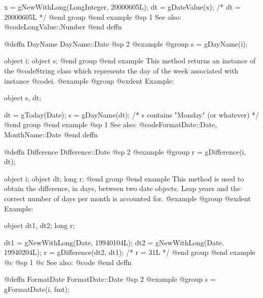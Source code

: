 x = gNewWithLong(LongInteger, 20000605L);
dt = gDateValue(x);    /*  dt = 20000605L  */
@end group
@end example
@sp 1
See also:  @code{LongValue::Number}
@end deffn











@deffn {DayName} DayName::Date
@sp 2
@example
@group
s = gDayName(i);

object  i;
object  s;
@end group
@end example
This method returns an instance of the @code{String} class which represents
the day of the week associated with instance @code{i}.
@example
@group
@exdent Example:

object  s, dt;

dt = gToday(Date);
s = gDayName(dt);   /*  s contains "Monday" (or whatever)  */
@end group
@end example
@sp 1
See also:  @code{FormatDate::Date, MonthName::Date}
@end deffn










@deffn {Difference} Difference::Date
@sp 2
@example
@group
r = gDifference(i, dt);

object  i;
object  dt;
long    r;
@end group
@end example
This method is used to obtain the difference, in days, between two
date objects.  Leap years and the correct number of days per month
is accounted for.
@example
@group
@exdent Example:

object  dt1, dt2;
long    r;

dt1 = gNewWithLong(Date, 19940104L);
dt2 = gNewWithLong(Date, 19940204L);
r = gDifference(dt2, dt1);    /*  r = 31L  */
@end group
@end example
@c @sp 1
@c See also:  @code{}
@end deffn







@deffn {FormatDate} FormatDate::Date
@sp 2
@example
@group
s = gFormatDate(i, fmt);

